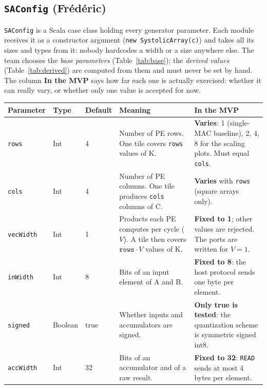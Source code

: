 \documentclass{article}
\begin{document}
\subsection*{\texttt{SAConfig} (Frédéric)}

\texttt{SAConfig} is a Scala case class holding every generator parameter. Each module receives it as a
constructor argument (\texttt{new SystolicArray(c)}) and takes all its sizes and types from it: nobody
hardcodes a width or a size anywhere else. The team chooses the \emph{base parameters}
(Table~\ref{tab:base}); the \emph{derived values} (Table~\ref{tab:derived}) are computed from them and
must never be set by hand. The column \textbf{In the MVP} says how far each one is actually exercised:
whether it can really vary, or whether only one value is accepted for now.

\begin{table}[htbp]
\small\renewcommand{\arraystretch}{1.25}
\begin{tabularx}{\linewidth}{@{} l l l Y Y @{}}
  \toprule
  \textbf{Parameter} & \textbf{Type} & \textbf{Default} & \textbf{Meaning} & \textbf{In the MVP} \\
  \midrule
  \texttt{rows}     & Int     & 4    & Number of PE rows. One tile covers \texttt{rows} values of K.
                    & \textbf{Varies}: 1 (single-MAC baseline), 2, 4, 8 for the scaling plots. Must equal \texttt{cols}. \\
  \texttt{cols}     & Int     & 4    & Number of PE columns. One tile produces \texttt{cols} columns of C.
                    & \textbf{Varies} with \texttt{rows} (square arrays only). \\
  \texttt{vecWidth} & Int     & 1    & Products each PE computes per cycle ($V$). A tile then covers $\texttt{rows}\cdot V$ values of K.
                    & \textbf{Fixed to 1}; other values are rejected. The ports are written for $V = 1$. \\
  \texttt{inWidth}  & Int     & 8    & Bits of an input element of A and B.
                    & \textbf{Fixed to 8}: the host protocol sends one byte per element. \\
  \texttt{signed}   & Boolean & true & Whether inputs and accumulators are signed.
                    & \textbf{Only true is tested}: the quantization scheme is symmetric signed int8. \\
  \texttt{accWidth} & Int     & 32   & Bits of an accumulator and of a raw result.
                    & \textbf{Fixed to 32}: \texttt{READ} sends at most 4 bytes per element. \\

\end{tabularx}
\end{table}
\end{document}
